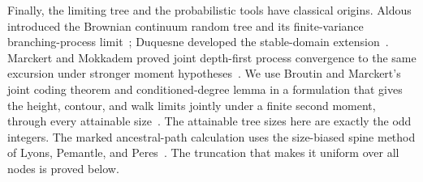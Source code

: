Finally, the limiting tree and the probabilistic tools have classical
origins. Aldous introduced the Brownian continuum random tree and its
finite-variance branching-process limit~\cite{Aldous1993}; Duquesne
developed the stable-domain extension~\cite{Duquesne2003}.
Marckert and Mokkadem proved joint depth-first process convergence to
the same excursion under stronger moment
hypotheses~\cite{MarckertMokkadem2003}. We use Broutin and Marckert's
joint coding theorem and conditioned-degree lemma in a formulation
that gives the height, contour, and walk limits jointly under a finite
second moment, through every attainable size~\cite{BroutinMarckert2014}.
The attainable tree sizes here are exactly the odd integers. The marked
ancestral-path calculation uses the size-biased spine method of
Lyons, Pemantle, and Peres~\cite[Section~2]{LyonsPemantlePeres1995}.
The truncation that makes it uniform over all nodes is proved below.
